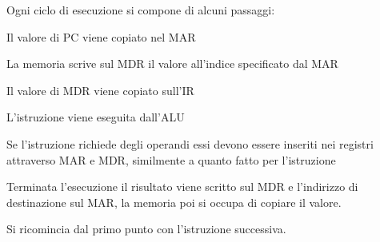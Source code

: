 Ogni ciclo di esecuzione si compone di alcuni passaggi:
\begin{sitemize}
    \item Il valore di PC viene copiato nel MAR
    \item La memoria scrive sul MDR il valore all'indice specificato dal MAR
    \item Il valore di MDR viene copiato sull'IR
    \item L'istruzione viene eseguita dall'ALU
    \begin{sitemize}
        \item Se l'istruzione richiede degli operandi essi devono essere inseriti nei registri attraverso MAR e MDR, similmente a quanto fatto per l'istruzione
    \end{sitemize}
    \item Terminata l'esecuzione il risultato viene scritto sul MDR e l'indirizzo di destinazione sul MAR, la memoria poi si occupa di copiare il valore.
    \item Si ricomincia dal primo punto con l'istruzione successiva.
\end{sitemize}
